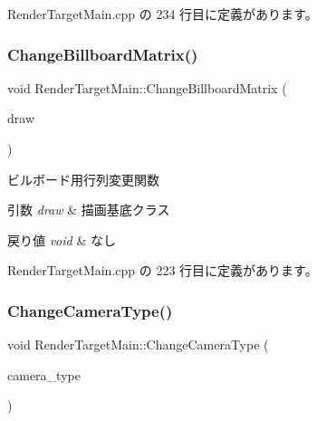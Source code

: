  Render\+Target\+Main.\+cpp の 234 行目に定義があります。

\mbox{\label{class_render_target_main_aa66eba70da8da7aa85af79b266212f0a}} 
\subsubsection{\texorpdfstring{Change\+Billboard\+Matrix()}{ChangeBillboardMatrix()}}
{\footnotesize\ttfamily void Render\+Target\+Main\+::\+Change\+Billboard\+Matrix (\begin{DoxyParamCaption}\item[{\mbox{\hyperlink{class_draw_base}{Draw\+Base}} $\ast$}]{draw }\end{DoxyParamCaption})\hspace{0.3cm}{\ttfamily [private]}}



ビルボード用行列変更関数 


\begin{DoxyParams}{引数}
{\em draw} & 描画基底クラス \\
\hline
\end{DoxyParams}

\begin{DoxyRetVals}{戻り値}
{\em void} & なし \\
\hline
\end{DoxyRetVals}


 Render\+Target\+Main.\+cpp の 223 行目に定義があります。

\mbox{\label{class_render_target_main_acc7030fab799fcd435ef37317d2b8ea0}} 
\subsubsection{\texorpdfstring{Change\+Camera\+Type()}{ChangeCameraType()}}
{\footnotesize\ttfamily void Render\+Target\+Main\+::\+Change\+Camera\+Type (\begin{DoxyParamCaption}\item[{\mbox{\hyperlink{class_camera_a3b0a1f58deca679ac665f61c480d1dcb}{Camera\+::\+Type}}}]{camera\+\_\+type }\end{DoxyParamCaption})\hspace{0.3cm}{\ttfamily [private]}}



